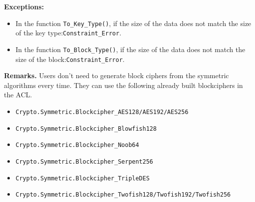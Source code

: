 \noindent\textbf{Exceptions:}
\begin{itemize}
\item In the function \texttt{To\_Key\_Type()}, if the size of the
  data does not match the size of the key
  type:\quad\texttt{Constraint\_Error}.
\item In the function \texttt{To\_Block\_Type()}, if the size of the
  data does not match the size of the
  block:\quad\texttt{Constraint\_Error}.
\end{itemize}


\noindent\textbf{Remarks.}
Users don't need to generate block ciphers from the symmetric
algorithms every time. They can use the following already built
blockciphers in the ACL.
\begin{itemize}
\item \texttt{Crypto.Symmetric.Blockcipher\_AES128/AES192/AES256}
\item \texttt{Crypto.Symmetric.Blockcipher\_Blowfish128}
\item \texttt{Crypto.Symmetric.Blockcipher\_Noob64}
\item \texttt{Crypto.Symmetric.Blockcipher\_Serpent256}
\item \texttt{Crypto.Symmetric.Blockcipher\_TripleDES}
\item \texttt{Crypto.Symmetric.Blockcipher\_Twofish128/Twofish192/Twofish256}
\end{itemize}
